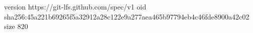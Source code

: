 version https://git-lfs.github.com/spec/v1
oid sha256:45a221b69265f5a32912a28c122e9a277aea465b97794eb4c46fde8900a42c02
size 820
